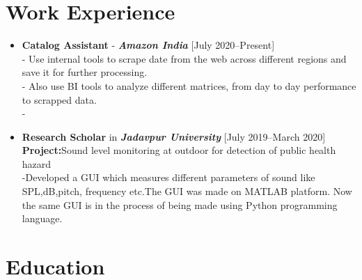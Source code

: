 \documentclass[11pt,a4paper]{moderncv}
\begin{document}

\section{Work Experience}

\begin{itemize}
	
	\item \textbf{Catalog Assistant} - \textit{\textbf{Amazon India}} \hfill [July 2020--Present]\\
	- Use internal tools to scrape date from the web across different regions and save it for further processing.\\
	- Also use BI tools to analyze different matrices, from day to day performance to scrapped data.\\
	- 
	
	
	
	\item \textbf{Research Scholar} in \textit{\textbf{Jadavpur University}} \hfill [July 2019--March 2020]\\
	\textbf{Project:}Sound level monitoring at
	outdoor for detection of public health hazard\\
	-Developed a GUI which measures different parameters of sound like
	SPL,dB,pitch, frequency etc.The GUI was made on MATLAB platform. Now the
	same GUI is in the process of being made using Python programming language.
	
	
\end{itemize}

\section{Education}
\end{document}
